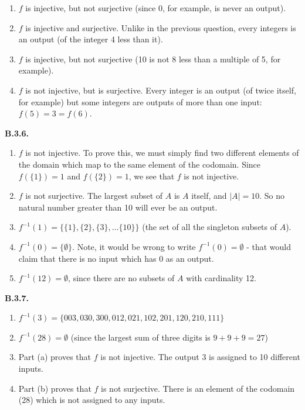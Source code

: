 \documentclass[10pt,]{book}
\theoremstyle{plain}
\theoremstyle{definition}
\theoremstyle{definition}
\theoremstyle{definition}
\theoremstyle{definition}
\numberwithin{equation}{chapter}
\def\inv{^{-1}}
\begin{document}
\begin{enumerate}[label=(\alph*)]
\item\hypertarget{li-577}{}\(f\) is injective, but not surjective (since 0, for example, is never an output).%
\item\hypertarget{li-578}{}\(f\) is injective and surjective. Unlike in the previous question, every integers is an output (of the integer 4 less than it).%
\item\hypertarget{li-579}{}\(f\) is injective, but not surjective (10 is not 8 less than a multiple of 5, for example).%
\item\hypertarget{li-580}{}\(f\) is not injective, but is surjective. Every integer is an output (of twice itself, for example) but some integers are outputs of more than one input: \(f(5) = 3 = f(6)\).%
\end{enumerate}
%
\par\smallskip
\noindent\textbf{B.3.6.} \hypertarget{p-1816}{}%
\leavevmode%
\begin{enumerate}[label=(\alph*)]
\item\hypertarget{li-586}{}\hypertarget{p-1817}{}%
\(f\) is not injective. To prove this, we must simply find two different elements of the domain which map to the same element of the codomain. Since \(f(\{1\}) = 1\) and \(f(\{2\}) = 1\), we see that \(f\) is not injective.%
\item\hypertarget{li-587}{}\hypertarget{p-1818}{}%
\(f\) is not surjective. The largest subset of \(A\) is \(A\) itself, and \(|A| = 10\). So no natural number greater than 10 will ever be an output.%
\item\hypertarget{li-588}{}\hypertarget{p-1819}{}%
\(f\inv(1) = \{\{1\}, \{2\}, \{3\}, \ldots \{10\}\}\) (the set of all the singleton subsets of \(A\)).%
\item\hypertarget{li-589}{}\hypertarget{p-1820}{}%
\(f\inv(0) = \{\emptyset\}\). Note, it would be wrong to write \(f\inv(0) = \emptyset\) - that would claim that there is no input which has 0 as an output.%
\item\hypertarget{li-590}{}\hypertarget{p-1821}{}%
\(f\inv(12) = \emptyset\), since there are no subsets of \(A\) with cardinality 12.%
\end{enumerate}
%
\par\smallskip
\noindent\textbf{B.3.7.} \hypertarget{p-1827}{}%
\leavevmode%
\begin{enumerate}[label=(\alph*)]
\item\hypertarget{li-595}{}\(f\inv(3) = \{003, 030, 300, 012, 021, 102, 201, 120, 210, 111\}\)%
\item\hypertarget{li-596}{}\(f\inv(28) = \emptyset\) (since the largest sum of three digits is \(9+9+9 = 27\))%
\item\hypertarget{li-597}{}\hypertarget{p-1828}{}%
Part (a) proves that \(f\) is not injective. The output 3 is assigned to 10 different inputs.%
\item\hypertarget{li-598}{}\hypertarget{p-1829}{}%
Part (b) proves that \(f\) is not surjective. There is an element of the codomain (28) which is not assigned to any inputs.%
\end{enumerate}
\end{document}
